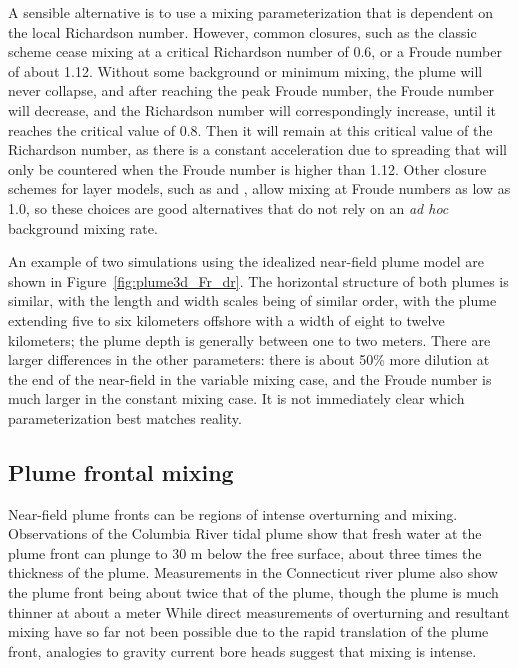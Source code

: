\documentclass[12pt]{article}
\begin{document}
A sensible alternative is to use a mixing parameterization that is dependent on the local Richardson number. However, common closures, such as the classic \citet{ellison.turner:59} scheme cease mixing at a critical Richardson number of 0.6, or a Froude number of about 1.12. Without some background or minimum mixing, the plume will never collapse, and after reaching the peak Froude number, the Froude number will decrease, and the Richardson number will correspondingly increase, until it reaches the critical value of 0.8. Then it will remain at this critical value of the Richardson number, as there is a constant acceleration due to spreading that will only be countered when the Froude number is higher than 1.12. Other closure schemes for layer models, such as \citet{christodoulou:86} and \citet{cenedese.adduce:08}, allow mixing at Froude numbers as low as 1.0, so these choices are good alternatives that do not rely on an {\it ad hoc} background mixing rate. 

An example of two simulations using the idealized near-field plume model are shown in Figure~\ref{fig:plume3d_Fr_dr}. The horizontal structure of both plumes is similar, with the length and width scales being of similar order, with the plume extending five to six kilometers offshore with a width of eight to twelve kilometers; the plume depth is generally between one to two meters. There are larger differences in the other parameters: there is about 50\% more dilution at the end of the near-field in the variable mixing case, and the Froude number is much larger in the constant mixing case. It is not immediately clear which parameterization best matches reality.


\subsection{Plume frontal mixing}

Near-field plume fronts can be regions of intense overturning and mixing. Observations of the Columbia River tidal plume show that fresh water at the plume front can plunge to 30 m below the free surface, about three times the thickness of the plume. Measurements in the Connecticut river plume also show the plume front being about twice that of the plume, though the plume is much thinner at about a meter \citep{odonnell.ea:98} While direct measurements of overturning and resultant mixing have so far not been possible due to the rapid translation of the plume front, analogies to gravity current bore heads suggest that mixing is intense.
\end{document}
